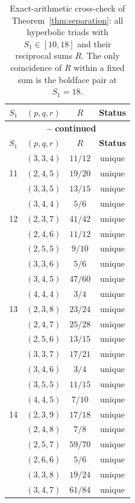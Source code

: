 \documentclass[12pt, letterpaper]{article}
\theoremstyle{definition}
\theoremstyle{plain}
\begin{document}
\vspace{0.3cm}
\begin{longtable}{cccc}
\caption{Exact-arithmetic cross-check of Theorem~\ref{thm:separation}: all hyperbolic triads with $S_1\in[10,18]$ and their reciprocal sums $R$. The only coincidence of $R$ within a fixed sum is the boldface pair at $S_1=18$.}\label{tab:enum}\\
\toprule
\textbf{$S_1$} & \textbf{$(p,q,r)$} & \textbf{$R$} & \textbf{Status} \\
\midrule
\endfirsthead
\multicolumn{4}{c}{{\bfseries \tablename\ \thetable{} -- continued}} \\
\toprule
\textbf{$S_1$} & \textbf{$(p,q,r)$} & \textbf{$R$} & \textbf{Status} \\
\midrule
\endhead
\bottomrule
\endfoot
\bottomrule
\endlastfoot
10 & $(3,3,4)$ & $11/12$ & unique \\
\midrule
11 & $(2,4,5)$ & $19/20$ & unique \\
   & $(3,3,5)$ & $13/15$ & unique \\
   & $(3,4,4)$ & $5/6$ & unique \\
\midrule
12 & $(2,3,7)$ & $41/42$ & unique \\
   & $(2,4,6)$ & $11/12$ & unique \\
   & $(2,5,5)$ & $9/10$ & unique \\
   & $(3,3,6)$ & $5/6$ & unique \\
   & $(3,4,5)$ & $47/60$ & unique \\
   & $(4,4,4)$ & $3/4$ & unique \\
\midrule
13 & $(2,3,8)$ & $23/24$ & unique \\
   & $(2,4,7)$ & $25/28$ & unique \\
   & $(2,5,6)$ & $13/15$ & unique \\
   & $(3,3,7)$ & $17/21$ & unique \\
   & $(3,4,6)$ & $3/4$ & unique \\
   & $(3,5,5)$ & $11/15$ & unique \\
   & $(4,4,5)$ & $7/10$ & unique \\
\midrule
14 & $(2,3,9)$ & $17/18$ & unique \\
   & $(2,4,8)$ & $7/8$ & unique \\
   & $(2,5,7)$ & $59/70$ & unique \\
   & $(2,6,6)$ & $5/6$ & unique \\
   & $(3,3,8)$ & $19/24$ & unique \\
   & $(3,4,7)$ & $61/84$ & unique \\

\end{longtable}
\end{document}
